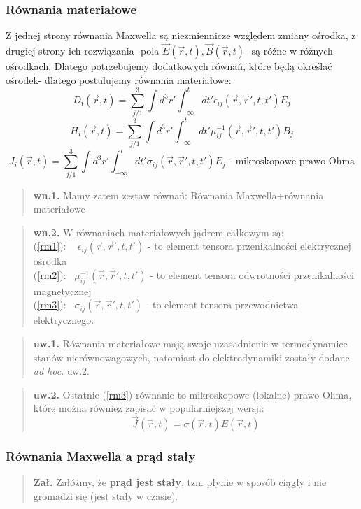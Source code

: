 \documentclass[11pt]{article}
\newcommand{\B}{\vec{B}(\vec{r},t)}
\newcommand{\E}{\vec{E}(\vec{r},t)}
\renewcommand{\arg}{(\vec{r},t)}
\newcommand{\argg}{(\vec{r},\vec{r}',t,t')}
\begin{document}
	\subsubsection{Równania materiałowe} 
	Z jednej strony równania Maxwella są niezmiennicze względem zmiany ośrodka, z drugiej strony ich rozwiązania- pola $\E,\B$- są różne w różnych ośrodkach. Dlatego potrzebujemy dodatkowych równań, które będą określać ośrodek- dlatego postulujemy równania materiałowe:
	\begin{equation} {D}_i\arg=\sum_{j/1}^3\int d^3r'\int_{-\infty}^t dt' \epsilon_{ij}\argg E_j \label{rm1}\end{equation}
	\begin{equation} H_i \arg =\sum_{j/1}^3\int d^3r'\int_{-\infty}^t dt' \mu^{-1}_{ij}\argg B_j \label{rm2}\end{equation}
	\begin{equation} J_i \arg =\sum_{j/1}^3\int d^3r'\int_{-\infty}^t dt' \sigma_{ij}\argg E_j \label{rm3}  \text{ - mikroskopowe prawo Ohma}\end{equation}
	\begin{verse}\textbf{wn.1.} Mamy zatem zestaw równań: Równania Maxwella+równania materiałowe \end{verse}
	\begin{verse}\textbf{wn.2.} W równaniach materiałowych jądrem całkowym są:\\
	(\ref{rm1}): ~ $\epsilon_{ij}\argg$ - to element tensora przenikalności elektrycznej ośrodka\\
	(\ref{rm2}):  ~$\mu^{-1}_{ij}\argg$ - to element tensora odwrotności przenikalności magnetycznej\\
	(\ref{rm3}):  ~$\sigma_{ij}\argg$  - to element tensora przewodnictwa elektrycznego. \end{verse}
	\begin{verse} \textbf{uw.1.} Równania materiałowe mają swoje uzasadnienie w termodynamice stanów nierównowagowych, natomiast do elektrodynamiki zostały dodane \textsl{ad hoc}.
	uw.2. \end{verse}
	\begin{verse} \textbf{uw.2.} Ostatnie (\ref{rm3}) równanie to mikroskopowe (lokalne) prawo Ohma, które można również zapisać w popularniejszej wersji:
	\begin{equation} \vec{J} \arg =\sigma\arg E\arg \end{equation} \end{verse}

	\subsubsection{Równania Maxwella a prąd stały}
	\begin{verse} \textbf{Zał.} Załóżmy, że \textbf{prąd jest stały}, tzn. płynie w sposób ciągły i nie gromadzi się (jest stały w czasie). \end{verse}
\end{document}
